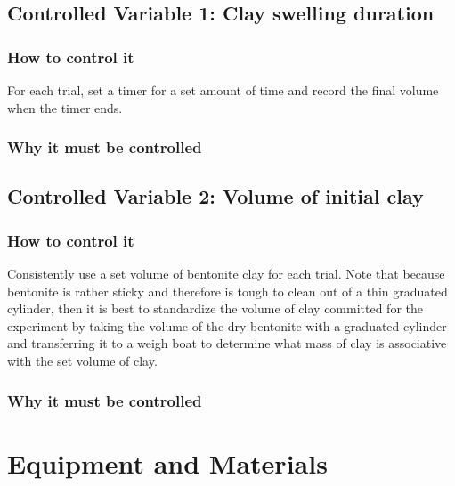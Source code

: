 \documentclass[11pt, letterpaper]{article}
\begin{document}
\subsection{Controlled Variable 1: Clay swelling duration}
\subsubsection{How to control it}
For each trial, set a timer for a set amount of time and record
the final volume when the timer ends.
\subsubsection{Why it must be controlled}

\subsection{Controlled Variable 2: Volume of initial clay}
\subsubsection{How to control it}
Consistently use a set volume of bentonite clay for each trial. Note
that because bentonite is rather sticky and therefore is tough
to clean out of a thin graduated cylinder, then it is best to
standardize the volume of clay committed for the experiment
by taking the volume of the dry bentonite with a graduated cylinder
and transferring it to a weigh boat to determine what mass of clay
is associative with the set volume of clay.
\subsubsection{Why it must be controlled}


\section{Equipment and Materials}
\end{document}
